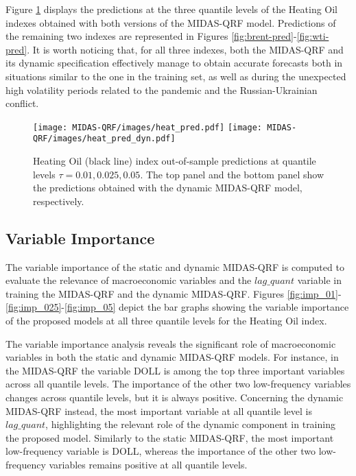 

Figure \ref{fig:heat-pred} displays the predictions at the three quantile levels of the Heating Oil indexes obtained with both versions of the MIDAS-QRF model. Predictions of the remaining two indexes are represented in Figures \ref{fig:brent-pred}-\ref{fig:wti-pred}. It is worth noticing that, for all three indexes, both the MIDAS-QRF and its dynamic specification effectively manage to obtain accurate forecasts both in situations similar to the one in the training set, as well as during the unexpected high volatility periods related to the pandemic and the Russian-Ukrainian conflict.


\begin{figure}[H]
    \centering
    \texttt{[image: MIDAS-QRF/images/heat\_pred.pdf]}
\texttt{[image: MIDAS-QRF/images/heat\_pred\_dyn.pdf]}
    \caption{Heating Oil (black line) index out-of-sample predictions at quantile levels $\tau= 0.01, 0.025, 0.05$. The top panel and the bottom panel show the predictions obtained with the dynamic MIDAS-QRF model, respectively.}
    \label{fig:heat-pred}
\end{figure}


\subsection{Variable Importance}

The variable importance of the static and dynamic MIDAS-QRF is computed to evaluate the relevance of macroeconomic variables and the $lag\_quant$ variable in training the MIDAS-QRF and the dynamic MIDAS-QRF.
Figures \ref{fig:imp_01}-\ref{fig:imp_025}-\ref{fig:imp_05} depict the bar graphs showing the variable importance of the proposed models at all three quantile levels for the Heating Oil index. 

\vspace{0.15in}

\noindent The variable importance analysis reveals the significant role of macroeconomic variables in both the static and dynamic MIDAS-QRF models. For instance, in the MIDAS-QRF the variable DOLL is among the top three important variables across all quantile levels. The importance of the other two low-frequency variables changes across quantile levels, but it is always positive. 
Concerning the dynamic MIDAS-QRF instead, the most important variable at all quantile level  is $lag\_quant$, highlighting the relevant role of the dynamic component in training the proposed model. Similarly to the static MIDAS-QRF, the most important low-frequency variable is DOLL, whereas the importance of the other two low-frequency variables remains positive at all quantile levels.

